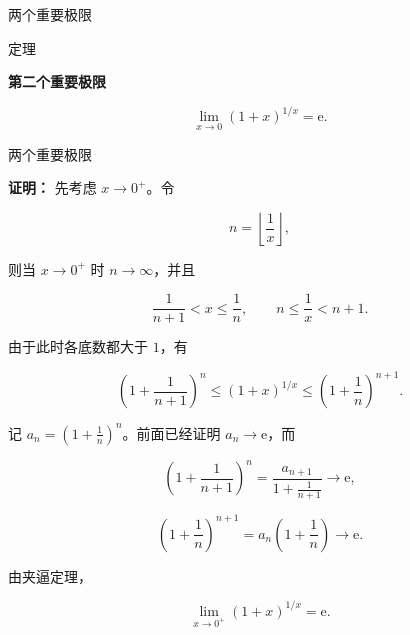 \documentclass[aspectratio=169,10pt,fontset=fandol]{ctexbeamer}
\newcommand{\ee}{\mathrm{e}}
\begin{document}
\begin{frame}[t,fragile]{两个重要极限}
\normalsize
\begin{block}{定理}
{\normalsize
\textbf{第二个重要极限}\par


\[

\lim_{x\to0}(1+x)^{1/x}=\ee.

\]


}
\end{block}
\end{frame}
\begin{frame}[t,fragile]{两个重要极限}
\footnotesize
{\footnotesize
\textbf{证明：}
先考虑 \(x\to0^+\)。令

\[

n=\left\lfloor\frac1x\right\rfloor,

\]

则当 \(x\to0^+\) 时 \(n\to\infty\)，并且

\[

\frac1{n+1}<x\leq\frac1n,\qquad n\leq\frac1x<n+1.

\]

由于此时各底数都大于 \(1\)，有

\[

\left(1+\frac1{n+1}\right)^n

\leq(1+x)^{1/x}

\leq\left(1+\frac1n\right)^{n+1}.

\]

记 \(a_n=(1+\frac1n)^n\)。前面已经证明 \(a_n\to\ee\)，而

\[

\left(1+\frac1{n+1}\right)^n

=\frac{a_{n+1}}{1+\frac1{n+1}}\to\ee,

\]

\[

\left(1+\frac1n\right)^{n+1}

=a_n\left(1+\frac1n\right)\to\ee.

\]

由夹逼定理，

\[

\lim_{x\to0^+}(1+x)^{1/x}=\ee.

\]




}
\end{frame}
\end{document}
